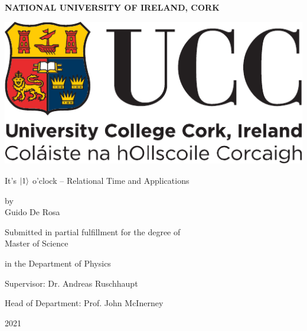 \thispagestyle{empty}


\begin{centering}

\textbf{NATIONAL UNIVERSITY OF IRELAND, CORK}

\vspace{1cm}

\includegraphics[width=0.333\linewidth]{img/ucc_logo.pdf}

\vspace{0.5in}

\Huge

{It's ${\ket{1}}$ o'clock -- Relational Time and Applications}

\vspace{0.25in}

\Large
by
\\
Guido De Rosa

\vspace{0.5in}

\large

Submitted in partial fulfillment for the degree of\\
Master of Science

in the Department of Physics

\vspace{0.25in}

Supervisor: Dr. Andreas Ruschhaupt

Head of Department: Prof. John McInerney

\vspace{2cm}

\Large
2021

\end{centering}

\clearpage

\restoregeometry
